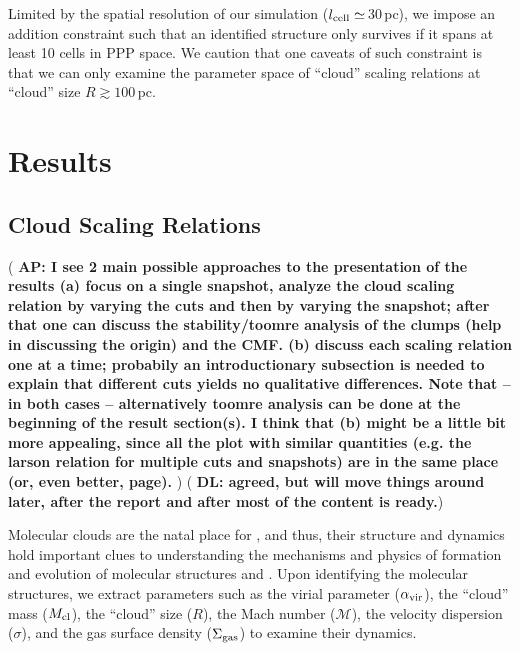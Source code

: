 \documentclass[iop]{emulateapj} %
\newcommand{\AP}[1]{({\bf \color{apcolor} AP: #1})}
\newcommand{\DL}[1]{({\bf \color{dlcolor} DL: #1})}
\begin{document}
Limited by the spatial resolution of our simulation ($l_{\rm cell}\simeq$\,30\,pc), we impose an addition constraint such that an identified structure only survives if it spans at least 10 cells in PPP space. We caution that one caveats of such constraint is that we can only examine the parameter space of ``cloud'' scaling relations at ``cloud'' size $R\gtrsim100$\,pc.


\section{Results}     \label{sec:results}


\subsection{Cloud Scaling Relations}

\AP{I see 2 main possible approaches to the presentation of the results
%
(a) focus on a single snapshot, analyze the cloud scaling relation by varying the cuts and then by varying the snapshot; after that one can discuss the stability/toomre analysis of the clumps (help in discussing the origin) and the CMF.
%
(b) discuss each scaling relation one at a time; probabily an introductionary subsection is needed to explain that different cuts yields no qualitative differences.
%
Note that -- in both cases -- alternatively toomre analysis can be done at the beginning of the result section(s).
%
I think that (b) might be a little bit more appealing, since all the plot with similar quantities (e.g. the larson relation for multiple cuts and snapshots) are in the same place (or, even better, page).
}
\DL{agreed, but will move things around later, after the report and after most of the content is ready.}

Molecular clouds are the natal place for \SF, and thus,
their structure and dynamics hold important clues to understanding
the mechanisms and physics of formation and evolution of molecular structures and \SF.
Upon identifying the molecular structures, we extract parameters such as
the virial parameter ($\alpha_{\rm vir}$),
the ``cloud'' mass ($M_{\rm cl}$),
the ``cloud'' size ($R$),
the Mach number ($\mathcal{M}$),
the velocity dispersion ($\sigma$), and the
gas surface density ($\Sigma_{\rm gas}$)
to examine their dynamics.
\end{document}
